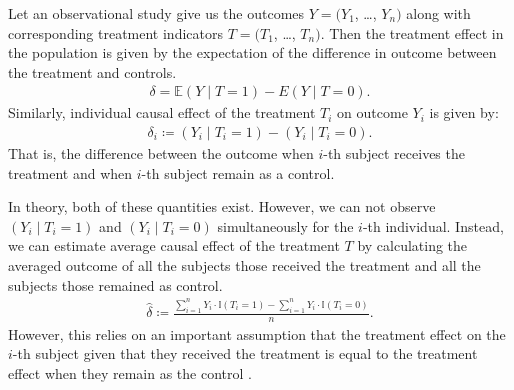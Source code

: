 \documentclass[oribibl]{llncs}
\begin{document}
Let an observational study give us the outcomes $Y=(Y_1$, \dots, $Y_n)$ along with 
corresponding treatment indicators $T=(T_1$, \dots, $T_n)$. Then the
treatment 
effect in the population is given by the expectation of the difference
in outcome between the treatment and controls. 
\begin{align}
	\delta = \mathbb{E}(Y\mid T =1) - E(Y\mid T=0).
\end{align}
Similarly, individual causal
effect of the treatment $T_i$ on outcome $Y_i$ is given by:
\begin{align}
	\delta_i \coloneqq (Y_i\mid T_i=1) - (Y_i\mid T_i=0).
\end{align}
That is, the difference between the outcome when $i$-th subject receives
the treatment and when $i$-th subject remain as a control. 

In theory, both of these quantities exist.
However, we can not observe $(Y_i\mid T_i=1)$ and $(Y_i\mid T_i=0)$
simultaneously for the $i$-th individual. Instead, we can estimate
average causal effect of the treatment $T$ by calculating the averaged
outcome of all the subjects those received the treatment and
all the subjects those remained as control.
\begin{align}
	\hat{\delta} \coloneqq 
	\frac{\sum_{i=1}^n Y_i\cdot\mathbb{I}(T_i=1) - 
		\sum_{i=1}^n Y_i\cdot\mathbb{I}(T_i=0)}{n}.
\end{align}
However, this relies on an important assumption that the treatment effect
on the $i$-th subject given that they received the treatment is
equal to the treatment effect when they remain as the control
\cite{winship99}.
\end{document}
